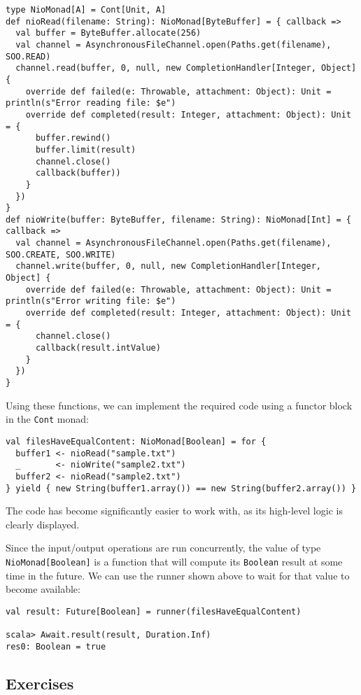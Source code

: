 \begin{lstlisting}
type NioMonad[A] = Cont[Unit, A]
def nioRead(filename: String): NioMonad[ByteBuffer] = { callback =>
  val buffer = ByteBuffer.allocate(256)
  val channel = AsynchronousFileChannel.open(Paths.get(filename), SOO.READ)
  channel.read(buffer, 0, null, new CompletionHandler[Integer, Object] {
    override def failed(e: Throwable, attachment: Object): Unit = println(s"Error reading file: $e")
    override def completed(result: Integer, attachment: Object): Unit = {
      buffer.rewind()
      buffer.limit(result)
      channel.close()
      callback(buffer))
    }
  })
}
def nioWrite(buffer: ByteBuffer, filename: String): NioMonad[Int] = { callback =>
  val channel = AsynchronousFileChannel.open(Paths.get(filename), SOO.CREATE, SOO.WRITE) 
  channel.write(buffer, 0, null, new CompletionHandler[Integer, Object] {
    override def failed(e: Throwable, attachment: Object): Unit = println(s"Error writing file: $e")
    override def completed(result: Integer, attachment: Object): Unit = {
      channel.close()
      callback(result.intValue)
    }
  })
}
\end{lstlisting}
Using these functions, we can implement the required code using a
functor block in the \lstinline!Cont! monad:
\begin{lstlisting}
val filesHaveEqualContent: NioMonad[Boolean] = for {
  buffer1 <- nioRead("sample.txt")
  _       <- nioWrite("sample2.txt")
  buffer2 <- nioRead("sample2.txt")
} yield { new String(buffer1.array()) == new String(buffer2.array()) }
\end{lstlisting}
The code has become significantly easier to work with, as its high-level
logic is clearly displayed.

Since the input/output operations are run concurrently, the value
of type \lstinline!NioMonad[Boolean]! is a function that will compute
its \lstinline!Boolean! result at some time in the future. We can
use the runner shown above to wait for that value to become available:
\begin{lstlisting}
val result: Future[Boolean] = runner(filesHaveEqualContent)

scala> Await.result(result, Duration.Inf)
res0: Boolean = true
\end{lstlisting}


\subsection{Exercises}

